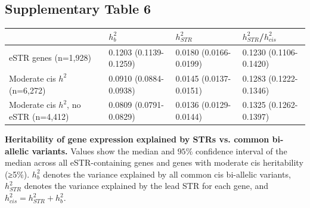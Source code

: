 \pagebreak
\subsection{Supplementary Table 6}
\label{tab:estrsuptab6}
\begin{table}[h!]
\begin{adjustbox}{width=1\textwidth}
\begin{tabular}{l|l|l|l}
 & $h^2_b$ & $h^2_{STR}$ & $h^2_{STR}$/$h^2_{cis}$ \\
\hline
eSTR genes (n=1,928)         &	0.1203 (0.1139-0.1259) &	0.0180 (0.0166-0.0199)	& 0.1230 (0.1106-0.1420)\\\hline
Moderate cis $h^2$ (n=6,272) &	0.0910 (0.0884-0.0938) &	0.0145 (0.0137-0.0151)	& 0.1283 (0.1222-0.1346)\\\hline
Moderate cis $h^2$, no eSTR (n=4,412) & 0.0809 (0.0791-0.0829) & 0.0136 (0.0129-0.0144) & 0.1325 (0.1262-0.1397) \\\hline
\end{tabular}
\end{adjustbox}
\end{table}
\textbf{Heritability of gene expression explained by STRs vs. common bi-allelic variants.} Values show the median and $95\%$ confidence interval of the median across all eSTR-containing genes and genes with moderate cis heritability (≥5\%). $h^2_b$ denotes the variance explained by all common cis bi-allelic variants, $h^2_{STR}$ denotes the variance explained by the lead STR for each gene, and $h^2_{cis} = h^2_{STR} + h^2_b$.


\pagebreak
